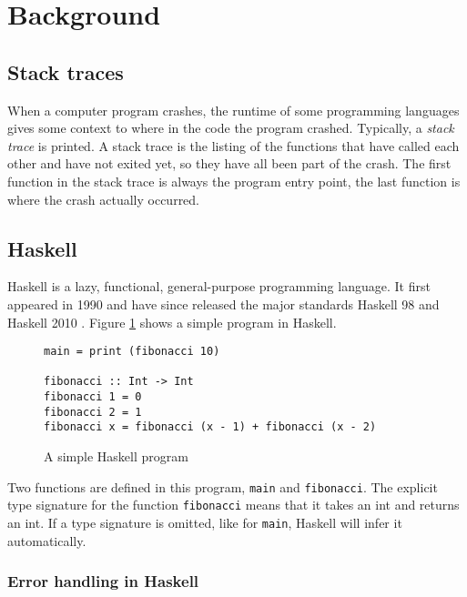 \section{Background}


\subsection{Stack traces}

When a computer program crashes, the runtime of some programming languages
gives some context to where in the code the program crashed.
Typically, a \emph{stack trace} is printed. A stack trace is the listing
of the functions that have called each other and have not exited yet, so
they have all been part of the crash. The first function in the stack
trace is always the program entry point, the last function is where the
crash actually occurred.


\subsection{Haskell}

Haskell is a lazy, functional, general-purpose programming language.
\cite{haskell_report2010}
It first appeared in 1990 \cite{HistoryOfHaskell2007}  and have since
released the major standards Haskell 98 and Haskell 2010
\cite{haskell_report2010}. Figure \ref{fig:simple_program} shows a simple program in Haskell.

\begin{figure}
  \begin{verbatim}
main = print (fibonacci 10)

fibonacci :: Int -> Int
fibonacci 1 = 0
fibonacci 2 = 1
fibonacci x = fibonacci (x - 1) + fibonacci (x - 2)
  \end{verbatim}
  \caption{A simple Haskell program}
  \label{fig:simple_program}
\end{figure}


Two functions are defined in this program, \texttt{main} and
\texttt{fibonacci}.  The explicit type signature for the function
\texttt{fibonacci} means that it takes an int and returns an int. If a type
signature is omitted, like for \texttt{main}, Haskell will infer it automatically.

\subsubsection{Error handling in Haskell}

